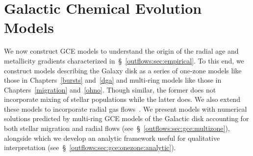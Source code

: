 
\section{Galactic Chemical Evolution Models}
\label{outflows:sec:gce}
We now construct GCE models to understand the origin of the radial age and
metallicity gradients characterized in~\S~\ref{outflows:sec:empirical}.
To this end, we construct models describing the Galaxy disk as a series of
one-zone models like those in Chapters~\ref{bursts} and~\ref{dga} and
multi-ring models like those in Chapters~\ref{migration} and~\ref{ohno}.
Though similar, the former does not incorporate mixing of stellar populations
while the latter does.
We also extend these models to incorporate radial gas
flows~\citep[e.g.,][]{Lacey1985, Bilitewski2012}.
We present models with numerical solutions predicted by multi-ring GCE models
of the Galactic disk accounting for both stellar migration and radial flows
(see~\S~\ref{outflows:sec:gce:multizone}), alongside which we develop an
analytic framework useful for qualitative interpretation
(see~\S~\ref{outflows:sec:gce:onezone:analytic}).

